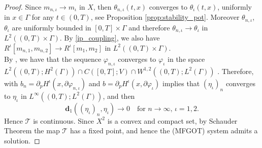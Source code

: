 \documentclass[smallextended,referee,envcountsect,]{svjour3}
\newcommand{\lra}{\longrightarrow}
\newcommand{\Wass}{\mathbf{d}}
\newcommand{\G}{\Gamma}
\newcommand{\cT}{{\mathcal T}}
\renewcommand{\phi}{\varphi}
\renewcommand{\th}{\theta}
\begin{document}
\begin{proof}
Since $m_{n,\iota}\lra m_\iota$ in $X$, then $\th_{n,\iota}(t, x)$ converges to $\th_\iota(t, x)$, uniformly in $x\in\G$ for any $t\in (0,T)$, see Proposition \ref{prop:stability_pot}. Moreover 
$\th_{n,\iota}$, $\th_\iota$ are uniformly bounded in $[0,T]\times\G$ and therefore $\th_{n,\iota}\lra \th_\iota$ in $L^2((0,T)\times\G)$. By \eqref{ip_coupling}, we also have  $R^\iota[m_{n,1}, m_{n,2}] \lra R^\iota[m_1, m_2] $  in $L^2((0, T)\times\Gamma)$. \\
By \cite[Lemma 4.1]{achdou}, we have that the sequence $\phi_{n,\iota}$ converges to $\phi_\iota$ in the space $L^2((0, T); H^2(\Gamma))\cap C([0, T]; V)\cap W^{1, 2}((0, T); L^2(\Gamma))$ . Therefore, \cite[Theorem 3.1]{achdou} with $b_n=\partial_pH^\iota(x, \partial\phi_{n,\iota})$ and  $b=\partial_pH^\iota(x, \partial\phi_\iota)$ implies that $(\eta_\iota)_n$ converges to $\eta_\iota$ in $L^\infty\left((0,T);L^2(\Gamma)\right)$, and then 
$$\Wass_1((\eta_\iota)_n, \eta_\iota)\lra 0\quad \text{for $n\to \infty$, $\iota=1,2$}.$$ Hence $\cT$ is continuous. Since $X^2$ is a convex and compact set, by Schauder Theorem the map $\cT$ has a fixed point, and hence the {(MFGOT)} system admits a solution.


\end{proof}
\end{document}
